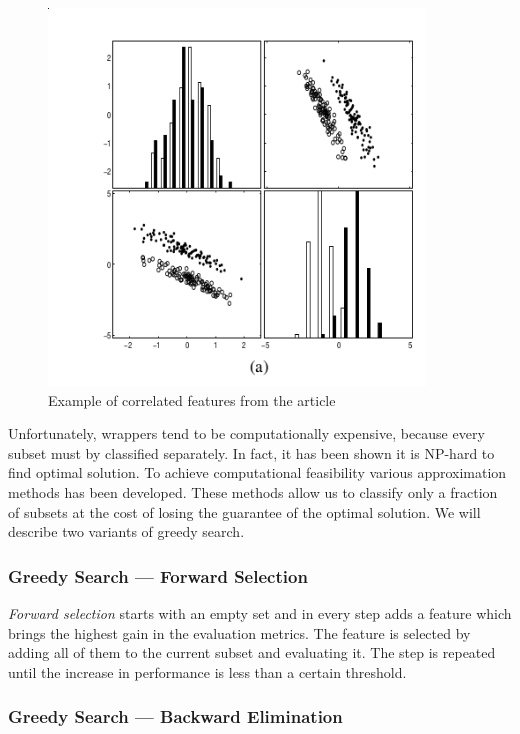 
\begin{figure}[ht]\centering
\includegraphics[width=100mm]{../img/guyeli_figure3.png}
\caption{Example of correlated features from the article}
\label{guyeli03-figure3}
\end{figure}

Unfortunately, wrappers tend to be computationally expensive, because every subset must by classified separately. In fact, it has been shown it is NP-hard to find optimal solution. To achieve computational feasibility various approximation methods has been developed. These methods allow us to classify only a fraction of subsets at the cost of losing the guarantee of the optimal solution. We will describe two variants of greedy search.


\subsubsection{Greedy Search --- Forward Selection}

{\it Forward selection} starts with an empty set and in every step adds a feature which brings the highest gain in the evaluation metrics. The feature is selected by adding all of them to the current  subset and evaluating it. The step is repeated until the increase in performance is less than a certain threshold. 

\subsubsection{Greedy Search --- Backward Elimination}

